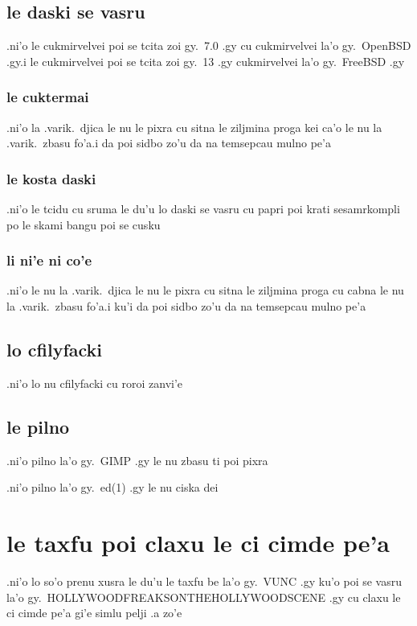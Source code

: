 \documentclass{report}
\begin{document}
\subsection{le daski se vasru}
.ni'o le cukmirvelvei poi se tcita zoi gy.\ 7.0 .gy cu cukmirvelvei la'o gy.\ OpenBSD .gy\@  .i le cukmirvelvei poi se tcita zoi gy.\ 13 .gy cukmirvelvei la'o gy.\ FreeBSD .gy

\subsubsection{le cuktermai}
.ni'o la .varik.\ djica le nu le pixra cu sitna le ziljmina proga kei ca'o le nu la .varik.\ zbasu fo'a\@  .i da poi sidbo zo'u da na temsepcau mulno pe'a

\subsubsection{le kosta daski}
.ni'o le tcidu cu sruma le du'u lo daski se vasru cu papri poi krati sesamrkompli po le skami bangu poi se cusku

\subsubsection{li ni'e ni co'e}
.ni'o le nu la .varik.\ djica le nu le pixra cu sitna le ziljmina proga cu cabna le nu la .varik.\ zbasu fo'a\@  .i ku'i da poi sidbo zo'u da na temsepcau mulno pe'a

\subsection{lo cfilyfacki}
.ni'o lo nu cfilyfacki cu roroi zanvi'e

\subsection{le pilno}
.ni'o pilno la'o gy.\ GIMP .gy le nu zbasu ti poi pixra

.ni'o pilno la'o gy.\ ed(1) .gy le nu ciska dei

\section{le taxfu poi claxu le ci cimde pe'a}
.ni'o lo so'o prenu xusra le du'u le taxfu be la'o gy.\ VUNC .gy ku'o poi se vasru la'o gy.\ HOLLYWOODFREAKSONTHEHOLLYWOODSCENE .gy cu claxu le ci cimde pe'a gi'e simlu pelji .a zo'e
\end{document}
